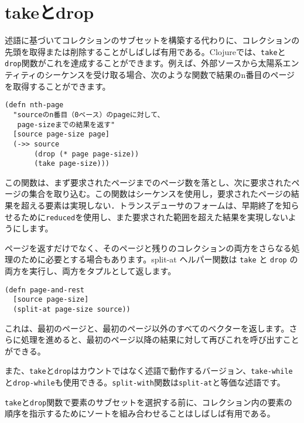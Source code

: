\section{takeとdrop}

述語に基づいてコレクションのサブセットを構築する代わりに、コレクションの先頭を取得または削除することがしばしば有用である。Clojureでは、\texttt{take}と\texttt{drop}関数がこれを達成することができます。例えば、外部ソースから太陽系エンティティのシーケンスを受け取る場合、次のような関数で結果のn番目のページを取得することができます。


\begin{lstlisting}[numbers=none]
(defn nth-page
  "sourceのn番目（0ベース）のpageに対して、
   page-sizeまでの結果を返す"
  [source page-size page]
  (->> source
       (drop (* page page-size))
       (take page-size)))
\end{lstlisting}

この関数は、まず要求されたページまでのページ数を落とし、次に要求されたページの集合を取り込む。この関数はシーケンスを使用し，要求されたページの結果を超える要素は実現しない．トランスデューサのフォームは、早期終了を知らせるために\texttt{reduced}を使用し、また要求された範囲を超えた結果を実現しないようにします。

ページを返すだけでなく、そのページと残りのコレクションの両方をさらなる処理のために必要とする場合もあります。split-at ヘルパー関数は \texttt{take} と \texttt{drop} の両方を実行し、両方をタプルとして返します。


\begin{lstlisting}[numbers=none]
(defn page-and-rest
  [source page-size]
  (split-at page-size source))
\end{lstlisting}

これは、最初のページと、最初のページ以外のすべてのベクターを返します。さらに処理を進めると、最初のページ以降の結果に対して再びこれを呼び出すことができる。

また、\texttt{take}と\texttt{drop}はカウントではなく述語で動作するバージョン、\texttt{take-while}と\texttt{drop-while}も使用できる。\texttt{split-with}関数は\texttt{split-at}と等価な述語です。

\texttt{take}と\texttt{drop}関数で要素のサブセットを選択する前に、コレクション内の要素の順序を指示するためにソートを組み合わせることはしばしば有用である。




